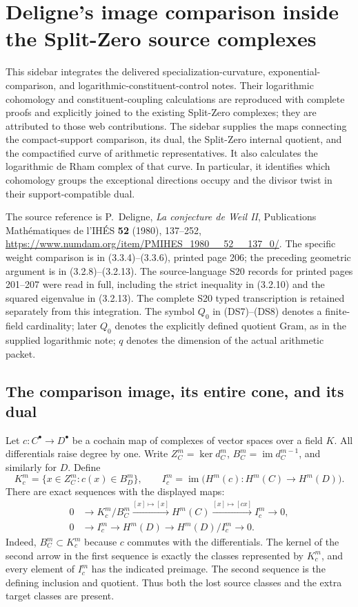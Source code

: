 \section{Deligne's image comparison inside the Split-Zero source complexes}
\label{sec:deligne-split-sidebar}

This sidebar integrates the delivered specialization-curvature, exponential-comparison,
and logarithmic-constituent-control notes. Their logarithmic cohomology and
constituent-coupling calculations are reproduced with complete proofs and
explicitly joined to the existing Split-Zero complexes; they are attributed
to those web contributions. The sidebar supplies the maps connecting the compact-support comparison,
its dual, the Split-Zero internal quotient, and the compactified curve of
arithmetic representatives.  It also calculates the logarithmic de Rham
complex of that curve.  In particular, it identifies which cohomology
groups the exceptional directions occupy and the divisor twist in their
support-compatible dual.

The source reference is P.~Deligne, \emph{La conjecture de Weil II},
Publications Math\'ematiques de l'IH\'ES \textbf{52} (1980), 137--252,
\url{https://www.numdam.org/item/PMIHES_1980__52__137_0/}.
The specific weight comparison is in (3.3.4)--(3.3.6), printed page 206;
the preceding geometric argument is in (3.2.8)--(3.2.13).
The source-language S20 records for printed pages 201--207 were read in full,
including the strict inequality in (3.2.10) and the squared eigenvalue in
(3.2.13). The complete S20 typed transcription is retained separately from
this integration.  The symbol $Q_0$ in (DS7)--(DS8) denotes a finite-field
cardinality; later $Q_0$ denotes the explicitly defined quotient Gram,
as in the supplied logarithmic note; $q$ denotes the dimension of the actual arithmetic packet.

\subsection{The comparison image, its entire cone, and its dual}

Let $c:C^\bullet\to D^\bullet$ be a cochain map of complexes of vector
spaces over a field $K$.  All differentials raise degree by one.  Write
$Z_C^m=\ker d_C^m$, $B_C^m=\operatorname{im}d_C^{m-1}$, and similarly
for $D$.  Define
\[
 K_c^m=\{x\in Z_C^m:c(x)\in B_D^m\},\qquad
 I_c^m=\operatorname{im}\bigl(H^m(c):H^m(C)\to H^m(D)\bigr).
 \tag{DS1}
\]
There are exact sequences with the displayed maps:
\[
\begin{split}
0&\longrightarrow K_c^m/B_C^m
 \xrightarrow{[x]\mapsto[x]} H^m(C)
 \xrightarrow{[x]\mapsto[cx]} I_c^m\longrightarrow0,\\
0&\longrightarrow I_c^m\longrightarrow H^m(D)
 \longrightarrow H^m(D)/I_c^m\longrightarrow0.
\end{split}\tag{DS2}
\]
Indeed, $B_C^m\subset K_c^m$ because $c$ commutes with the differentials.
The kernel of the second arrow in the first sequence is exactly the
classes represented by $K_c^m$, and every element of $I_c^m$ has the
indicated preimage.  The second sequence is the defining inclusion and
quotient.  Thus both the lost source classes and the extra target classes
are present.

